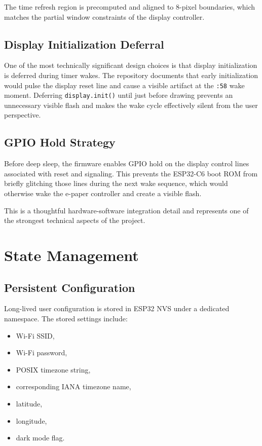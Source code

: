 \documentclass[11pt]{article}
\begin{document}
The time refresh region is precomputed and aligned to 8-pixel boundaries, which matches the partial window constraints of the display controller.

\subsection{Display Initialization Deferral}
One of the most technically significant design choices is that display initialization is deferred during timer wakes. The repository documents that early initialization would pulse the display reset line and cause a visible artifact at the \texttt{:58} wake moment. Deferring \texttt{display.init()} until just before drawing prevents an unnecessary visible flash and makes the wake cycle effectively silent from the user perspective.

\subsection{GPIO Hold Strategy}
Before deep sleep, the firmware enables GPIO hold on the display control lines associated with reset and signaling. This prevents the ESP32-C6 boot ROM from briefly glitching those lines during the next wake sequence, which would otherwise wake the e-paper controller and create a visible flash.

This is a thoughtful hardware-software integration detail and represents one of the strongest technical aspects of the project.

\section{State Management}
\subsection{Persistent Configuration}
Long-lived user configuration is stored in ESP32 NVS under a dedicated namespace. The stored settings include:
\begin{itemize}
  \item Wi-Fi SSID,
  \item Wi-Fi password,
  \item POSIX timezone string,
  \item corresponding IANA timezone name,
  \item latitude,
  \item longitude,
  \item dark mode flag.
\end{itemize}
\end{document}

